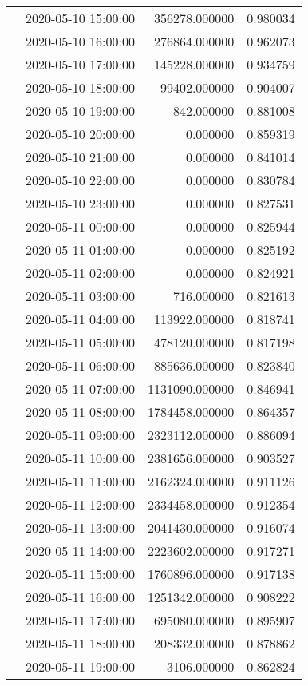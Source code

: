 \begin{tabular}{llrr}
 & 2020-05-10 15:00:00 & 356278.000000 & 0.980034 \\
 & 2020-05-10 16:00:00 & 276864.000000 & 0.962073 \\
 & 2020-05-10 17:00:00 & 145228.000000 & 0.934759 \\
 & 2020-05-10 18:00:00 & 99402.000000 & 0.904007 \\
 & 2020-05-10 19:00:00 & 842.000000 & 0.881008 \\
 & 2020-05-10 20:00:00 & 0.000000 & 0.859319 \\
 & 2020-05-10 21:00:00 & 0.000000 & 0.841014 \\
 & 2020-05-10 22:00:00 & 0.000000 & 0.830784 \\
 & 2020-05-10 23:00:00 & 0.000000 & 0.827531 \\
 & 2020-05-11 00:00:00 & 0.000000 & 0.825944 \\
 & 2020-05-11 01:00:00 & 0.000000 & 0.825192 \\
 & 2020-05-11 02:00:00 & 0.000000 & 0.824921 \\
 & 2020-05-11 03:00:00 & 716.000000 & 0.821613 \\
 & 2020-05-11 04:00:00 & 113922.000000 & 0.818741 \\
 & 2020-05-11 05:00:00 & 478120.000000 & 0.817198 \\
 & 2020-05-11 06:00:00 & 885636.000000 & 0.823840 \\
 & 2020-05-11 07:00:00 & 1131090.000000 & 0.846941 \\
 & 2020-05-11 08:00:00 & 1784458.000000 & 0.864357 \\
 & 2020-05-11 09:00:00 & 2323112.000000 & 0.886094 \\
 & 2020-05-11 10:00:00 & 2381656.000000 & 0.903527 \\
 & 2020-05-11 11:00:00 & 2162324.000000 & 0.911126 \\
 & 2020-05-11 12:00:00 & 2334458.000000 & 0.912354 \\
 & 2020-05-11 13:00:00 & 2041430.000000 & 0.916074 \\
 & 2020-05-11 14:00:00 & 2223602.000000 & 0.917271 \\
 & 2020-05-11 15:00:00 & 1760896.000000 & 0.917138 \\
 & 2020-05-11 16:00:00 & 1251342.000000 & 0.908222 \\
 & 2020-05-11 17:00:00 & 695080.000000 & 0.895907 \\
 & 2020-05-11 18:00:00 & 208332.000000 & 0.878862 \\
 & 2020-05-11 19:00:00 & 3106.000000 & 0.862824 \\

\end{tabular}
